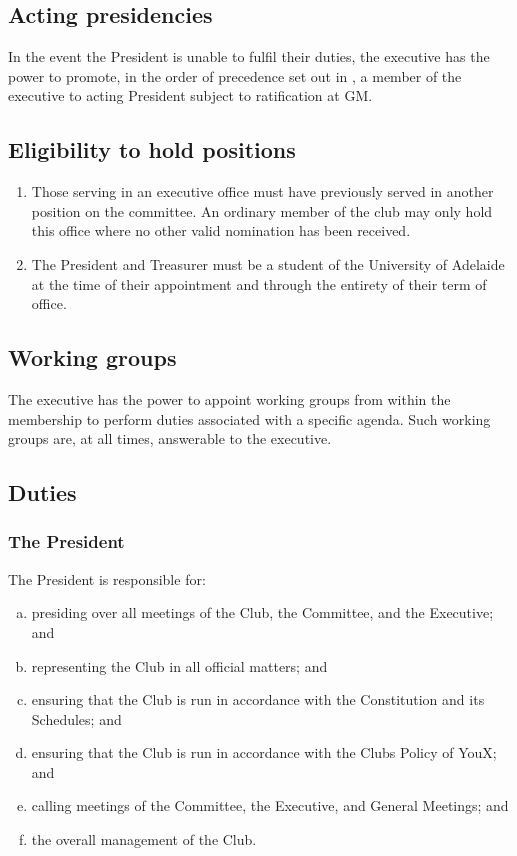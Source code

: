 \documentclass{constitution}
\begin{document}
\subsection{Acting presidencies}
In the event the President is unable to fulfil their duties, the executive has the power to promote, in the order of precedence set out in , a member of the executive to acting President subject to ratification at GM.

\subsection{Eligibility to hold positions}\label{execEligibility}
\begin{enumerate}[(1)]
    \item Those serving in an executive office must have previously served in another position on the committee. An ordinary member of the club may only hold this office where no other valid nomination has been received.
    \item The President and Treasurer must be a student of the University of Adelaide at the time of their appointment and through the entirety of their term of office.
\end{enumerate}

\subsection{Working groups}
The executive has the power to appoint working groups from within the membership to perform duties associated with a specific agenda. Such working groups are, at all times, answerable to the executive.

\subsection{Duties}

\subsubsection{The President}
The President is responsible for:
\begin{enumerate}[(a)]
    \item presiding over all meetings of the Club, the Committee, and the Executive; and
    \item representing the Club in all official matters; and
    \item ensuring that the Club is run in accordance with the Constitution and its Schedules; and
    \item ensuring that the Club is run in accordance with the Clubs Policy of YouX;
          and
    \item calling meetings of the Committee, the Executive, and General Meetings;
          and
    \item the overall management of the Club.
\end{enumerate}
\end{document}
